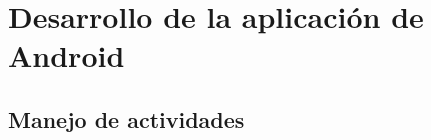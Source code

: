 %
%
%
%
%
%
%
%
%
%

\chapter{Desarrollo de la aplicaci\'on de Android}
\label{cap5}
\label{cap:aplicacion_android}


\begin{resumen}

\end{resumen}

\section{Manejo de actividades}
\label{cap5:sec:actividades}

